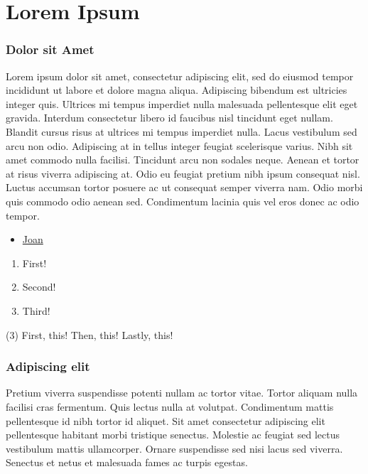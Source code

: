 \documentclass[../main.tex]{subfiles}
\begin{document}
\part[Lorem Ipsum]{Lorem Ipsum}
\section{Dolor sit Amet}
    Lorem \cite{texbook} ipsum dolor sit amet, consectetur \cite{latex:companion} adipiscing 
    elit, sed do eiusmod tempor incididunt ut labore et dolore magna aliqua. Adipiscing 
    bibendum est ultricies integer quis. Ultrices mi tempus imperdiet nulla malesuada 
    pellentesque \cite{latex2e} elit eget gravida. Interdum consectetur libero id faucibus 
    nisl tincidunt eget nullam. Blandit cursus risus at ultrices mi tempus imperdiet nulla. 
    Lacus vestibulum sed arcu non odio. Adipiscing at in tellus integer feugiat scelerisque 
    varius. Nibh sit amet commodo nulla facilisi. Tincidunt \cite{knuth:1984} arcu non sodales 
    neque. Aenean et tortor at risus viverra adipiscing at. Odio eu feugiat pretium nibh ipsum 
    consequat nisl. Luctus accumsan tortor posuere ac ut consequat semper viverra nam. Odio 
    morbi quis commodo odio aenean sed. Condimentum \cite{lesk:1977} lacinia quis vel eros 
    donec ac odio tempor.

    \begin{itemize}
        \item \href{www.google.com}{Joan}
    \end{itemize}

    \begin{enumerate}
        \item First!
        \item Second!
        \item Third!
    \end{enumerate}

    \begin{tasks}
        [style=enumerate, after-item-skip=4mm, label = {\alph*)}](3)
        \task First, this!
        \task Then, this!
        \task Lastly, this!
    \end{tasks}

    \section{Adipiscing elit}
    Pretium viverra suspendisse potenti nullam ac tortor vitae. Tortor 
    aliquam nulla facilisi cras fermentum. Quis lectus nulla at volutpat. 
    Condimentum mattis pellentesque id nibh tortor id aliquet. Sit amet 
    consectetur adipiscing elit pellentesque habitant morbi tristique 
    senectus. Molestie ac feugiat sed lectus vestibulum mattis 
    ullamcorper. Ornare suspendisse sed nisi lacus sed viverra. Senectus 
    et netus et malesuada fames ac turpis egestas.
    
\end{document}
